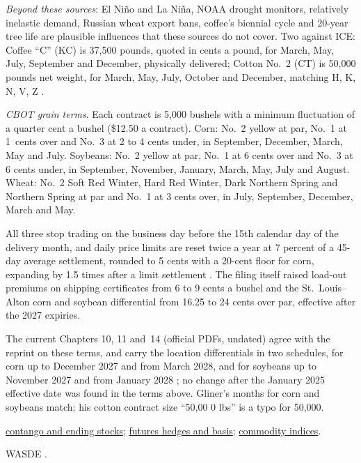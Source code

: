 \begin{qfdefinition}
 \emph{Beyond these sources}: El Ni\~no and La Ni\~na, NOAA drought monitors, relatively inelastic demand, Russian wheat export bans, coffee's biennial cycle and 20-year tree life are plausible influences that these sources do not cover. Two against ICE: Coffee ``C'' (KC) is 37,500 pounds, quoted in cents a pound, for March, May, July, September and December, physically delivered; Cotton No.~2 (CT) is 50,000 pounds net weight, for March, May, July, October and December, matching H, K, N, V, Z \citep[contract specifications]{ice-softs-specs}.

\emph{CBOT grain terms}. Each contract is 5{,}000 bushels with a minimum fluctuation of a quarter cent a bushel (\$12.50 a contract). Corn: No.~2 yellow at par, No.~1 at 1\textonehalf\ cents over and No.~3 at 2 to 4 cents under, in September, December, March, May and July. Soybeans: No.~2 yellow at par, No.~1 at 6 cents over and No.~3 at 6 cents under, in September, November, January, March, May, July and August. Wheat: No.~2 Soft Red Winter, Hard Red Winter, Dark Northern Spring and Northern Spring at par and No.~1 at 3 cents over, in July, September, December, March and May.

All three stop trading on the business day before the 15th calendar day of the delivery month, and daily price limits are reset twice a year at 7 percent of a 45-day average settlement, rounded to 5 cents with a 20-cent floor for corn, expanding by 1.5 times after a limit settlement \citep[Exhibit, Rules 10101--10104, 11101--11102 and 14101--14102]{cbot-24-443}. The filing itself raised load-out premiums on shipping certificates from 6 to 9 cents a bushel and the St.\ Louis--Alton corn and soybean differential from 16.25 to 24 cents over par, effective after the 2027 expiries.

The current Chapters 10, 11 and~14 (official PDFs, undated) agree with the reprint on these terms, and carry the location differentials in two schedules, for corn up to December 2027 and from March 2028, and for soybeans up to November 2027 and from January 2028 \citep[Rules 10101--10102, 10105, 11101--11102, 11105 and 14101--14102]{cbot-grain-chapters-2026}; no change after the January 2025 effective date was found in the terms above. Gliner's months for corn and soybeans match; his cotton contract size ``50,00 0 lbs'' is a typo for 50,000.

 \hyperref[def:contango-backwardation-stocks]{contango and ending stocks}; \hyperref[def:futures-hedge-basis]{futures hedges and basis}; \hyperref[def:commodity-indices-risk-return]{commodity indices}.

 WASDE \citep{physical-usda-wasde-2026}.

\end{qfdefinition}
